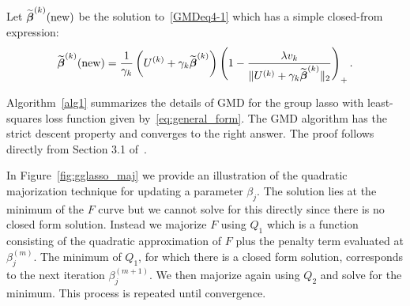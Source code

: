 Let $\widetilde{\boldsymbol{\beta}}^{(k)}(\textrm{new})$ be the solution to~\eqref{GMDeq4-1} which has a simple closed-from expression:
\begin{equation}
\widetilde{\boldsymbol{\beta}}^{(k)}(\textrm{new})=\frac{1}{\gamma_{k}}\left(U^{(k)}+\gamma_{k}\widetilde{\boldsymbol{\beta}}^{(k)}\right)\left(1-\frac{\lambda v_{k}}{\Vert U^{(k)}+\gamma_{k}\widetilde{\boldsymbol{\beta}}^{(k)}\Vert_{2}}\right)_{+}.\label{GMDeq5-1}
\end{equation}

Algorithm~\ref{alg1} summarizes the details of GMD for the group lasso with least-squares loss function given by~\eqref{eq:general_form}. The GMD algorithm has the strict descent property and converges to the right answer. The proof follows directly from Section 3.1 of~\cite{yang2015fast}. 

In Figure~\ref{fig:gglasso_maj} we provide an illustration of the quadratic majorization technique for updating a parameter $\beta_j$. The solution lies at the minimum of the $F$ curve but we cannot solve for this directly since there is no closed form solution. Instead we majorize $F$ using $Q_1$ which is a function consisting of the quadratic approximation of $F$ plus the penalty term evaluated at $\beta_j^{(m)}$. The minimum of $Q_1$, for which there is a closed form solution, corresponds to the next iteration $\beta_j^{(m+1)}$. We then majorize again using $Q_2$ and solve for the minimum. This process is repeated until convergence.  

 


